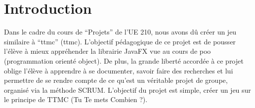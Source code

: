 \newpage
\section*{Introduction}
\label{sec:intro}
Dans le cadre du cours de ``Projets'' de l'UE 210, nous avons dû créer un jeu similaire à ``\acrlong{ttmc}'' (\acrshort{ttmc}).
L'objectif pédagogique de ce projet est de pousser l'élève à mieux appréhender la librairie JavaFX vue au cours de \acrshort{poo} (programmation orienté object).
De plus, la grande liberté accordée à ce projet oblige l'élève à apprendre à se documenter, savoir faire des recherches et lui permettre de se rendre compte de ce qu'est un véritable projet de groupe, organisé via la méthode SCRUM.
L'objectif du projet est simple, créer un jeu sur le principe de TTMC (Tu Te mets Combien ?).  
